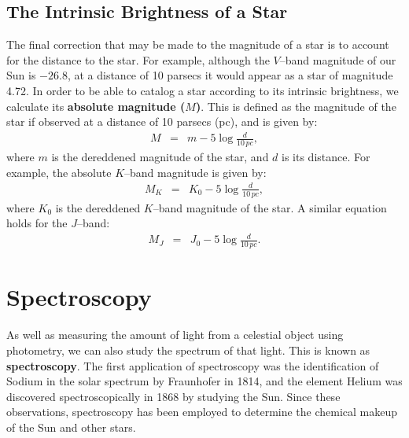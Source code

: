 \subsection{The Intrinsic Brightness of a Star}\label{cha:InfraredDataReductionTechniques:sec:MagnitudeScale:subsec:AbsoluteMagnitude}

The final correction that may be made to the magnitude of a star is to
account for the distance to the star. For example, although the $V$--band magnitude of our Sun is $-26.8$, at a distance of 10 parsecs it would
appear as a star of magnitude 4.72. In order to be able to catalog a star according
to its intrinsic brightness, we calculate its \textbf{absolute
magnitude ($M$)}. This is defined as the magnitude of the star if observed at a distance
of 10 parsecs (pc), and is given by:
\begin{eqnarray}\label{cha:InfraredDataReductionTechniques:sec:MagnitudeScale:subsec:AbsoluteMagnitude:eqn:AbsMag}
M & = & m - 5 \log{\frac{d}{10\,pc}},
\end{eqnarray}
where $m$ is the dereddened magnitude of the star, and $d$ is its
distance. For example, the absolute $K$--band magnitude is given by:
\begin{eqnarray}\label{cha:InfraredDataReductionTechniques:sec:MagnitudeScale:subsec:AbsoluteMagnitude:eqn:AbsMagK}
M_K & = & K_0 - 5 \log{\frac{d}{10\,pc}},
\end{eqnarray}
where $K_0$ is the dereddened $K$--band magnitude of the star. A
similar equation holds for the $J$--band:
\begin{eqnarray}\label{cha:InfraredDataReductionTechniques:sec:MagnitudeScale:subsec:AbsoluteMagnitude:eqn:AbsMagJ}
M_J & = & J_0 - 5 \log{\frac{d}{10\,pc}}.
\end{eqnarray}


\section{Spectroscopy}\label{cha:InfraredDataReductionTechniques:sec:Spectroscopy}

As well as measuring the amount of light from a celestial object using
photometry, we can also study the spectrum of that light. This is
known as \textbf{spectroscopy}. The first application of spectroscopy was the identification of Sodium
in the solar spectrum by Fraunhofer in 1814, and the element Helium was discovered spectroscopically in 1868 by studying the Sun. Since
these observations, spectroscopy has been employed to determine the
chemical makeup of the Sun and other stars. %

